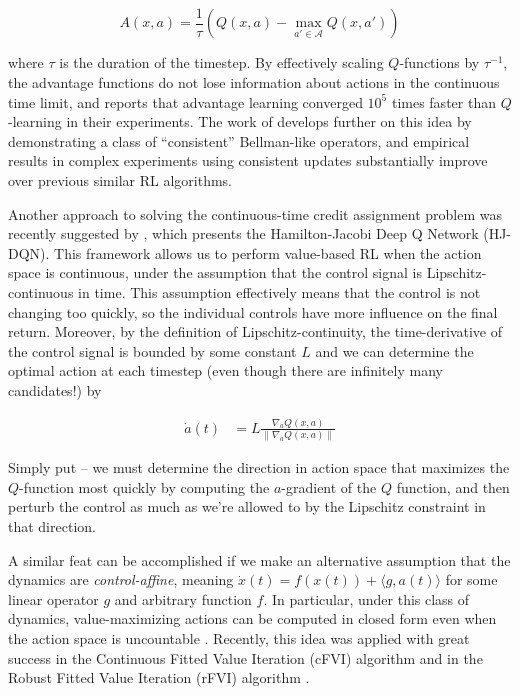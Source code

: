 \begin{equation}
  \label{eq:advantage-updating}
  A(x, a) = \frac{1}{\tau}\left(Q(x, a) - \max_{a'\in\mathcal{A}}Q(x, a')\right)
\end{equation}

where $\tau$ is the duration of the timestep. By effectively scaling
$Q$-functions by $\tau^{-1}$, the advantage functions do not lose
information about actions in the continuous time limit, and
\citet{baird1994reinforcement} reports that advantage learning
converged $10^5$ times faster than $Q$-learning in their
experiments. The work of \citet{bellemare2016increasing} develops
further on this idea by demonstrating a class of ``consistent''
Bellman-like operators, and empirical results in complex experiments
using consistent updates substantially improve over previous similar
RL algorithms.

Another approach to solving the continuous-time credit assignment
problem was recently suggested by \citet{kim2021hamilton}, which
presents the Hamilton-Jacobi Deep Q Network (HJ-DQN). This framework
allows us to perform value-based RL when the action space is
continuous, under the assumption that the control signal is
Lipschitz-continuous in time. This assumption effectively means that
the control is not changing too quickly, so the individual controls
have more influence on the final return. Moreover, by the definition
of Lipschitz-continuity, the time-derivative of the control signal is
bounded by some constant $L$ and we can determine the optimal action
at each timestep (even though there are infinitely many candidates!)
by

\begin{align*}
  \dot{a}(t) &= L\frac{\nabla_aQ(x, a)}{\|\nabla_a Q(x, a)\|}
\end{align*}

Simply put -- we must determine the direction in action space that
maximizes the $Q$-function most quickly by computing the $a$-gradient
of the $Q$ function, and then perturb the control as much as we're
allowed to by the Lipschitz constraint in that direction.

A similar feat can be accomplished if we make an alternative
assumption that the dynamics are \emph{control-affine}, meaning
$\dot{x}(t) = f(x(t)) + \langle g, a(t)\rangle$ for some linear
operator $g$ and arbitrary function $f$. In particular, under this
class of dynamics, value-maximizing actions can be computed in closed
form even when the action space is uncountable
\citep{tassa2007least}. Recently, this idea was applied with great
success in the Continuous Fitted Value Iteration (cFVI) algorithm
\citep{lutter2021value} and in the Robust Fitted Value Iteration
(rFVI) algorithm \citep{lutter2021continuous}. 

